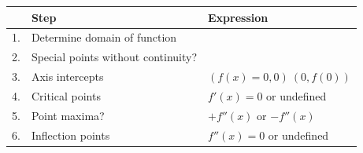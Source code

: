 \begin{table}[H]
    \begin{tabular}{rll}
            & Step                                 & Expression                                                                                                                                                                                                                                                                              \\ \hline
        1.  & Determine domain of function         &                                                                                                                                                                                                                                                                                         \\
        2.  & Special points without continuity?   &                                                                                                                                                                                                                                                                                         \\
        3.  & Axis intercepts                      & $(f(x)=0, 0)\ (0, f(0))$                                                                                                                                                                                                                                                                \\
        4.  & Critical points                      & $f'(x)=0$ or undefined                                                                                                                                                                                                                                                                  \\
        5.  & Point maxima?                        & $+f''(x)$ or $-f''(x)$                                                                                                                                                                                                                                                                  \\
        6.  & Inflection points                    & $f''(x)=0$ or undefined                                                                                                                                                                                                                                                                 \\

\end{tabular}
\end{table}
